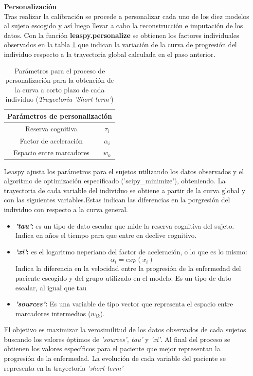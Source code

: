 \begin{description}
	\item \textbf{Personalización}\\
	Tras realizar la calibración se procede a personalizar cada uno de los diez modelos al sujeto escogido y así luego llevar a cabo la reconstrucción e imputación de los datos. Con la función \textbf{leaspy.personalize} se obtienen los factores individuales observados en la tabla \ref{tab:tabla7} que indican la variación de la curva de progresión del individuo respecto a la trayectoria global calculada en el paso anterior.
	
	\begin{table}[t]
		\centering
		\begin{tabular}{|c||c|} 
			\hline
			\multicolumn{2}{|c|}{Parámetros de personalización} \\
			\toprule
			Reserva cognitiva &  $\tau_{i}$\\ 
			\hline
			Factor de aceleración &  $\alpha_{i}$  \\
			\hline
			Espacio entre marcadores & $w_{k}$  \\
			
			\bottomrule
		\end{tabular}
		\caption{Parámetros para el proceso de personalización para la obtención de la curva a corto plazo de cada individuo (\textit{Trayectoria 'Short-term'})}
		\label{tab:tabla7}
	\end{table}
	
	Leaspy ajusta los parámetros para el sujetos utilizando los datos observados y el algoritmo de optimización especificado ('scipy\_minimize'), obteniendo. La trayectoria de cada variable del individuo se obtiene a partir de la curva global y con las siguientes variables.Estas indican las diferencias en la porgresión del individuo con respecto a la curva general.\\
	
	\begin{itemize}
		\item \textbf{\textit{'tau'}:} es un tipo de dato escalar que mide la reserva cognitiva del sujeto. Indica en años el tiempo para que entre en declive cognitivo. 
		\item \textbf{\textit{'xi'}:} es el logaritmo neperiano del factor de aceleración, o lo que es lo mismo:
		\begin{equation}
			\alpha_{i}=exp(x_{i})
		\end{equation}
		Indica la diferencia en la velocidad entre la progresión de la enfermedad del paciente escogido y del grupo utilizado en el modelo. Es un tipo de dato escalar, al igual que tau
		\item \textbf{\textit{'sources'}:} Es una variable de tipo vector que representa el espacio entre marcadores intermedios ($w_{ik}$).
	\end{itemize}
	 El objetivo es maximizar la verosimilitud de los datos observados de cada sujetos buscando los valores óptimos de \textit{'sources', tau'} y \textit{'xi'}. Al final del proceso se obtienen los valores específicos para el paciente que mejor representan la progresión de la enfermedad. La evolución de cada variable del paciente se representa en la trayectoria \textit{'short-term'}
	 

\end{description}
